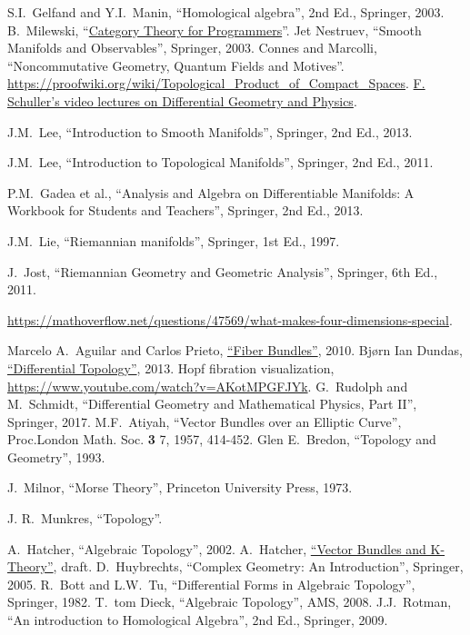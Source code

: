 \documentclass[english,letterpaper]{article}%
\numberwithin{equation}{section}
\numberwithin{figure}{section}
\numberwithin{table}{section}
\theoremstyle{definition}
\theoremstyle{definition}
\theoremstyle{definition}
\theoremstyle{plain}
\theoremstyle{plain}
\theoremstyle{plain}
\theoremstyle{plain}
\theoremstyle{remark}
\theoremstyle{remark}
\begin{document}
\newpage
{}
\begin{thebibliography}{}
S.I.~Gelfand and Y.I.~Manin, ``Homological algebra'', 2nd Ed., Springer, 2003.
 B.~Milewski, ``\href{https://github.com/hmemcpy/milewski-ctfp-pdf/}{Category Theory for Programmers}''.
 Jet Nestruev, ``Smooth Manifolds and Observables'', Springer, 2003.
 Connes and Marcolli, ``Noncommutative Geometry, Quantum Fields and Motives''.
 \url{https://proofwiki.org/wiki/Topological_Product_of_Compact_Spaces}.
 \href{https://www.youtube.com/playlist?list=PLPH7f_7ZlzxTi6kS4vCmv4ZKm9u8g5yic}{F. Schuller's video lectures on Differential Geometry and Physics}.

J.M.~Lee, ``Introduction to Smooth Manifolds'', Springer, 2nd Ed., 2013.

J.M.~Lee, ``Introduction to Topological Manifolds'', Springer, 2nd Ed., 2011. 

 P.M.~Gadea et al., ``Analysis and Algebra on Differentiable Manifolds: A Workbook for Students and Teachers'', Springer, 2nd Ed., 2013.

J.M.~Lie, ``Riemannian manifolds'', Springer, 1st Ed., 1997.

 J.~Jost, ``Riemannian Geometry and Geometric Analysis'', Springer, 6th Ed., 2011.


 \url{https://mathoverflow.net/questions/47569/what-makes-four-dimensions-special}.

 Marcelo A.~Aguilar and Carlos Prieto, \href{https://paginas.matem.unam.mx/cprieto/phocadownloadpap/Libros/fiber\%20bundles.pdf}{``Fiber Bundles''}, 2010.
 Bj{\o}rn Ian Dundas, \href{https://folk.uib.no/nmabd/dt/080627dt.pdf}{``Differential Topology''}, 2013.
 Hopf fibration visualization, \url{https://www.youtube.com/watch?v=AKotMPGFJYk}.
 G.~Rudolph and M.~Schmidt, ``Differential Geometry and Mathematical Physics, Part II'', Springer, 2017.
 M.F.~Atiyah, ``Vector Bundles over an Elliptic Curve'', Proc.London Math. Soc. \textbf{3} 7, 1957, 414-452.
 Glen E.~Bredon, ``Topology and Geometry'', 1993.


J.~Milnor, ``Morse Theory'', Princeton University Press, 1973.

J. R.~Munkres, ``Topology''.

 A.~Hatcher, ``Algebraic Topology'', 2002.
 A.~Hatcher, \href{https://pi.math.cornell.edu/~hatcher/VBKT/VB.pdf}{``Vector Bundles and K-Theory''}, draft.
 D.~Huybrechts, ``Complex Geometry: An Introduction'', Springer, 2005.
 R.~Bott and L.W.~Tu, ``Differential Forms in Algebraic Topology'', Springer, 1982.
 T.~tom Dieck, ``Algebraic Topology'', AMS, 2008.
 J.J.~Rotman, ``An introduction to Homological Algebra'', 2nd Ed., Springer, 2009.


\end{thebibliography}
\printindex
\end{document}
